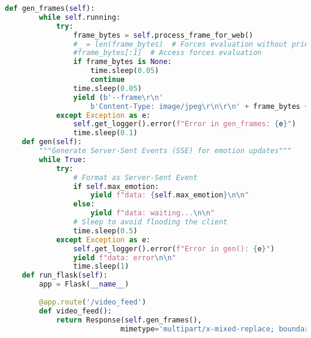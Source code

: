 \begin{lstlisting}[language=Python, caption={Python skript pre rozpoznávanie emócií}, label={lst:emotion-recognition}]
    def gen_frames(self):
        while self.running:
            try:
                frame_bytes = self.process_frame_for_web()
                #_ = len(frame_bytes)  # Forces evaluation without printing
                #frame_bytes[:1]  # Access forces evaluation
                if frame_bytes is None:
                    time.sleep(0.05)
                    continue
                time.sleep(0.05)
                yield (b'--frame\r\n'
                    b'Content-Type: image/jpeg\r\n\r\n' + frame_bytes + b'\r\n\r\n')
            except Exception as e:
                self.get_logger().error(f"Error in gen_frames: {e}")
                time.sleep(0.1)
    def gen(self):
        """Generate Server-Sent Events (SSE) for emotion updates"""
        while True:
            try:
                # Format as Server-Sent Event
                if self.max_emotion:
                    yield f"data: {self.max_emotion}\n\n"
                else:
                    yield f"data: waiting...\n\n"
                # Sleep to avoid flooding the client
                time.sleep(0.5)
            except Exception as e:
                self.get_logger().error(f"Error in gen(): {e}")
                yield f"data: error\n\n"
                time.sleep(1)
    def run_flask(self):
        app = Flask(__name__)
        
        @app.route('/video_feed')
        def video_feed():
            return Response(self.gen_frames(),
                           mimetype='multipart/x-mixed-replace; boundary=frame')
        

\end{lstlisting}
